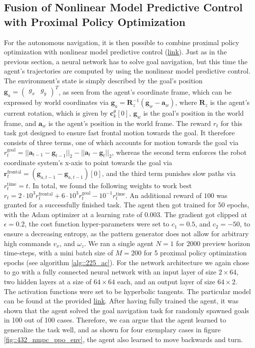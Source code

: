 \subsection{Fusion of Nonlinear Model Predictive Control with Proximal Policy Optimization}
\label{sec::431_fpp}
For the autonomous navigation, it is then possible to combine proximal policy optimization with nonlinear model predictive control (\href{https://github.com/mhubii/nmpc_pattern_generator/blob/dev/src/train_ppo_nmpc.cpp}{\underline{link}}). Just as in the previous section, a neural network has to solve goal navigation, but this time the agent's trajectories are computed by using the nonlinear model predictive control. The environment's state is simply described by the goal's position $\bm{g}_a=\begin{pmatrix}
g_x & g_y
\end{pmatrix}^T$, as seen from the agent's coordinate frame, which can be expressed by world coordinates via $\bm{g}_a = \bm{R}^{-1}_z(\bm{g}_w-\bm{a}_w)$, where $\bm{R}_z$ is the agent's current rotation, which is given by $\bm{c}_k^\theta[0]$, $\bm{g}_w$ is the goal's position in the world frame, and $\bm{a}_w$ is the agent's position in the world frame. The reward $r_t$ for this task got designed to ensure fast frontal motion towards the goal. It therefore consists of three terms, one of which accounts for motion towards the goal via $r_t^\text{goal} = ||\bm{a}_{t-1}-\bm{g}_{t-1}||_2 - ||\bm{a}_t-\bm{g}_t||_2$, whereas the second term enforces the robot coordinate system's x-axis to point towards the goal via $\bm{r}_t^\text{frontal} = (\bm{g}_{a,t-1}-\bm{g}_{a,t-1})[0]$, and the third term punishes slow paths via $r_t^\text{time}=t$. In total, we found the following weights to work best $r_t=2\cdot10^3r_t^\text{frontal}+6\cdot10^3r_t^\text{goal}-10^{-1}r_t^\text{time}$. An additional reward of $100$ was granted for a successfully finished task. The agent then got trained for 50 epochs, with the Adam optimizer at a learning rate of 0.003. The gradient got clipped at $\epsilon=0.2$, the cost function hyper-parameters were set to $c_1=0.5$, and $c_2=-50$, to ensure a decreasing entropy, as the pattern generator does not allow for arbitrary high commands $v_x$, and $\omega_z$. We ran a single agent $N=1$ for $2000$ preview horizon time-steps, with a mini batch size of $M=200$ for 5 proximal policy optimization epochs (see algorithm \ref{alg::225_ac}). For the network architecture we again chose to go with a fully connected neural network with an input layer of size $2\times64$, two hidden layers at a size of $64\times64$ each, and an output layer of size $64\times2$. The activation functions were set to be hyperbolic tangents. The particular model can be found at the provided \href{https://github.com/mhubii/nmpc_pattern_generator/blob/df058feeb5ba3afd88f2a855e5af148d25c23020/libs/learning/include/learning/models.h#L100}{\underline{link}}. After having fully trained the agent, it was shown that the agent solved the goal navigation task for randomly spawned goals in 100 out of 100 cases. Therefore, we can argue that the agent learned to generalize the task well, and as shown for four exemplary cases in figure \ref{fig::432_nmpc_ppo_env}, the agent also learned to move backwards and turn. 
